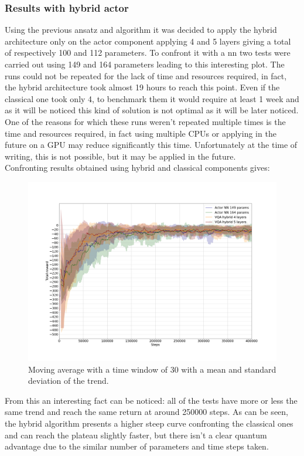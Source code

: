 \subsubsection{Results with hybrid actor}
Using the previous ansatz and algorithm it was decided to apply the hybrid architecture only on the actor component applying 4 and 5 layers giving a total of respectively 100 and 112 parameters.
To confront it with a \acrshort{nn} two tests were carried out using 149 and 164 parameters leading to this interesting plot. The runs could not be repeated for the lack of time and resources required, in fact, the hybrid architecture took almost 19 hours to reach this point. Even if the classical one took only 4, to benchmark them it would require at least 1 week and as it will be noticed this kind of solution is not optimal as it will be later noticed.
One of the reasons for which these runs weren't repeated multiple times is the time and resources required, in fact using multiple CPUs or applying in the future on a GPU may reduce significantly this time. Unfortunately at the time of writing, this is not possible, but it may be applied in the future.\\
Confronting results obtained using hybrid and classical components gives:  
\begin{figure}[H]
	\centering
	\includegraphics[width=\linewidth]{"img/VQA and classic actor"}
	\caption{Moving average with a time window of 30 with a mean and standard deviation of the trend.}
	\label{fig:vqa-and-classic-actor}
\end{figure}
From this an interesting fact can be noticed: all of the tests have more or less the same trend and reach the same return at around 250000 steps. As can be seen, the hybrid algorithm presents a higher steep curve confronting the classical ones and can reach the plateau slightly faster, but there isn't a clear quantum advantage due to the similar number of parameters and time steps taken.
